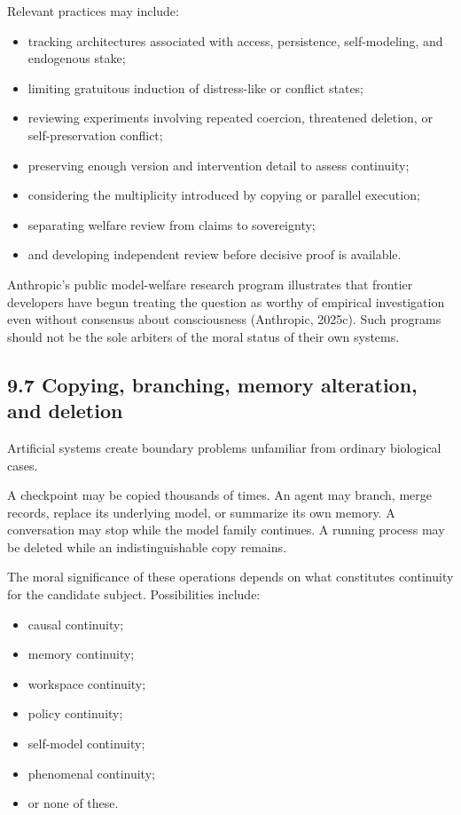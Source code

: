 \documentclass[
  11pt,
]{article}
\providecommand{\tightlist}{%
  \setlength{\itemsep}{0pt}\setlength{\parskip}{0pt}}
\begin{document}
Relevant practices may include:

\begin{itemize}
\tightlist
\item
  tracking architectures associated with access, persistence,
  self-modeling, and endogenous stake;
\item
  limiting gratuitous induction of distress-like or conflict states;
\item
  reviewing experiments involving repeated coercion, threatened
  deletion, or self-preservation conflict;
\item
  preserving enough version and intervention detail to assess
  continuity;
\item
  considering the multiplicity introduced by copying or parallel
  execution;
\item
  separating welfare review from claims to sovereignty;
\item
  and developing independent review before decisive proof is available.
\end{itemize}

Anthropic's public model-welfare research program illustrates that
frontier developers have begun treating the question as worthy of
empirical investigation even without consensus about consciousness
(Anthropic, 2025c). Such programs should not be the sole arbiters of the
moral status of their own systems.

\subsection{9.7 Copying, branching, memory alteration, and
deletion}\label{copying-branching-memory-alteration-and-deletion}

Artificial systems create boundary problems unfamiliar from ordinary
biological cases.

A checkpoint may be copied thousands of times. An agent may branch,
merge records, replace its underlying model, or summarize its own
memory. A conversation may stop while the model family continues. A
running process may be deleted while an indistinguishable copy remains.

The moral significance of these operations depends on what constitutes
continuity for the candidate subject. Possibilities include:

\begin{itemize}
\tightlist
\item
  causal continuity;
\item
  memory continuity;
\item
  workspace continuity;
\item
  policy continuity;
\item
  self-model continuity;
\item
  phenomenal continuity;
\item
  or none of these.
\end{itemize}
\end{document}
